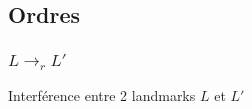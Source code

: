   \subsection{Ordres}

\begin{frame}
  \frametitle{$L \rightarrow_r L'$}

  \begin{block}{}
    Interférence entre 2 landmarks $L$ et $L'$
  \end{block}



\end{frame}

